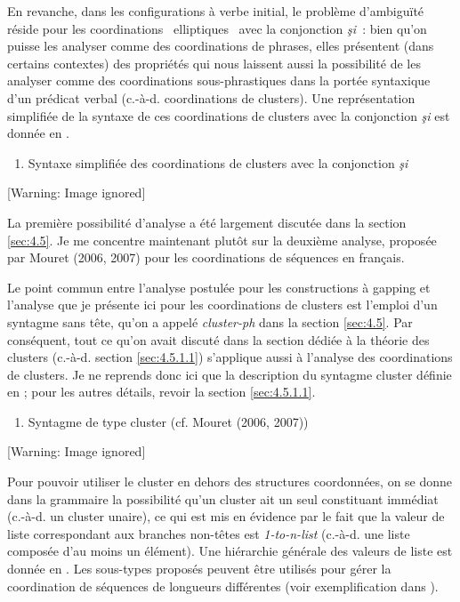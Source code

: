 En revanche, dans les configurations à verbe initial, le problème d'ambiguïté réside pour les coordinations {\guillemotleft}~elliptiques~{\guillemotright} avec la conjonction \textit{şi~}: bien qu'on puisse les analyser comme des coordinations de phrases, elles présentent (dans certains contextes) des propriétés qui nous laissent aussi la possibilité de les analyser comme des coordinations sous-phrastiques dans la portée syntaxique d'un prédicat verbal (c.-à-d. coordinations de clusters). Une représentation simplifiée de la syntaxe de ces coordinations de clusters avec la conjonction \textit{şi} est donnée en . 


\begin{enumerate}
\item \label{bkm:Ref300046106}Syntaxe simplifiée des coordinations de clusters avec la conjonction \textit{şi}


\end{enumerate}
{   [Warning: Image ignored] %
} 

La première possibilité d'analyse a été largement discutée dans la section \ref{sec:4.5}. Je me concentre maintenant plutôt sur la deuxième analyse, proposée par Mouret (2006, 2007) pour les coordinations de séquences en français.

Le point commun entre l'analyse postulée pour les constructions à gapping et l'analyse que je présente ici pour les coordinations de clusters est l'emploi d'un syntagme sans tête, qu'on a appelé \textit{cluster-ph} dans la section \ref{sec:4.5}. Par conséquent, tout ce qu'on avait discuté dans la section dédiée à la théorie des clusters (c.-à-d. section \ref{sec:4.5.1.1}) s'applique aussi à l'analyse des coordinations de clusters. Je ne reprends donc ici que la description du syntagme cluster définie en  ; pour les autres détails, revoir la section \ref{sec:4.5.1.1}. 


\begin{enumerate}
\item Syntagme de type cluster (cf. Mouret (2006, 2007))


\end{enumerate}
  [Warning: Image ignored] %
 

Pour pouvoir utiliser le cluster en dehors des structures coordonnées, on se donne dans la grammaire la possibilité qu'un cluster ait un seul constituant immédiat (c.-à-d. un cluster unaire), ce qui est mis en évidence par le fait que la valeur de liste correspondant aux branches non-têtes est \textit{1-to-n-list} (c.-à-d. une liste composée d'au moins un élément). Une hiérarchie générale des valeurs de liste est donnée en . Les sous-types proposés peuvent être utilisés pour gérer la coordination de séquences de longueurs différentes (voir exemplification dans \citet[333]{Mouret2007}).


